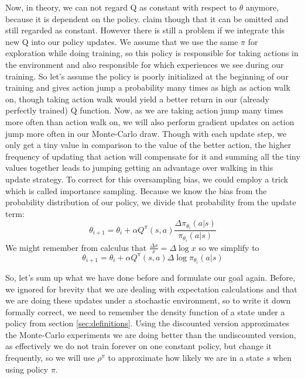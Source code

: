 \documentclass[hyperref,final,beleg]{cgvpub}
\begin{document}
Now, in theory, we can not regard Q as constant with respect to $\theta$ anymore, because it is dependent on the policy. \cite{suttonPolicyGradientMethods} claim though that it can be omitted and still regarded as constant. However there is still a problem if we integrate this new Q into our policy updates. We assume that we use the same $\pi$ for exploration while doing training, so this policy is responsible for taking actions in the environment and also responsible for which experiences we see during our training. So let's assume the policy is poorly initialized at the beginning of our training and gives action jump a probability many times as high as action walk on, though taking action walk would yield a better return in our (already perfectly trained) Q function. Now, as we are taking action jump many times more often than action walk on, we will also perform gradient updates on action jump more often in our Monte-Carlo draw. Though with each update step, we only get a tiny value in comparison to the value of the better action, the higher frequency of updating that action will compensate for it and summing all the tiny values together leads to jumping getting an advantage over walking in this update strategy. To correct for this oversampling bias, we could employ a trick which is called importance sampling. Because we know the bias from the probability distribution of our policy, we divide that probability from the update term:
\begin{equation}
\theta_{i+1} = \theta_i + \alpha Q^{\pi}(s, a) \frac{ \Delta \pi_{\theta_i}(a|s)}{\pi_{\theta_i}(a|s)}
\label{equ:pg_importancesampling}
\end{equation}
We might remember from calculus that $\frac{\Delta x}{x} = \Delta \log x$ so we simplify to
\begin{equation}
\theta_{i+1} = \theta_i + \alpha Q^{\pi}(s, a) \Delta \log \pi_{\theta_i}(a|s)
\label{equ:pg_update}
\end{equation}

So, let's sum up what we have done before and formulate our goal again. Before, we ignored for brevity that we are dealing with expectation calculations and that we are doing these updates under a stochastic environment, so to write it down formally correct, we need to remember the density function of a state under a policy from section \ref{sec:definitions}. Using the discounted version approximates the Monte-Carlo experiments we are doing better than the undiscounted version, as effectively we do not train forever on one constant policy, but change it frequently, so we will use $\rho^{\pi}$ to approximate how likely we are in a state $s$ when using policy $\pi$.
\end{document}
